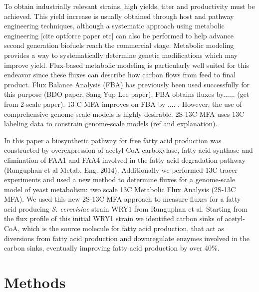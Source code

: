 \documentclass{bmcart}
\begin{document}
To obtain industrially relevant strains, high yields, titer and productivity must be achieved. This yield increase is usually obtained through host and pathway engineering techniques, although a systematic approach using metabolic engineering [cite optforce paper etc] can also be performed to help advance second generation biofuels reach the commercial stage. Metabolic modeling provides a way to systematically determine genetic modifications which may improve yield. Flux-based metabolic modeling is particularly well suited for this endeavor since these fluxes can describe how carbon flows from feed to final product. Flux Balance Analysis (FBA) has previously been used successfully for this purpose (BDO paper, Sang Yup Lee paper). FBA obtains fluxes by...... (get from 2-scale paper). 13 C MFA improves on FBA by .... . However, the use of comprehensive genome-scale models is highly desirable. 2S-13C MFA uses 13C labeling data to constrain genome-scale models (ref and explanation).

In this paper  a biosynthetic pathway for free fatty acid production was constructed by overexpression of acetyl-CoA carboxylase, fatty acid synthase and elimination of FAA1 and FAA4 involved in the fatty acid degradation pathway (Runguphan et al Metab. Eng. 2014). Additionally we performed 13C tracer experiments and used a new method to determine fluxes for a genome-scale model of yeast metabolism: two scale 13C Metabolic Flux Analysis (2S-13C MFA). We used this new  2S-13C MFA approach to measure fluxes for a fatty acid producing \emph{S. cerevisiae} strain WRY1 from Runguphan et al. Starting from the flux profile of this initial WRY1 strain we identified carbon sinks of acetyl-CoA, which is the source molecule for fatty acid production, that act as diversions from fatty acid production and downregulate enzymes involved in the carbon sinks, eventually improving fatty acid production by over 40\%. 

 


\section*{Methods}
\end{document}
